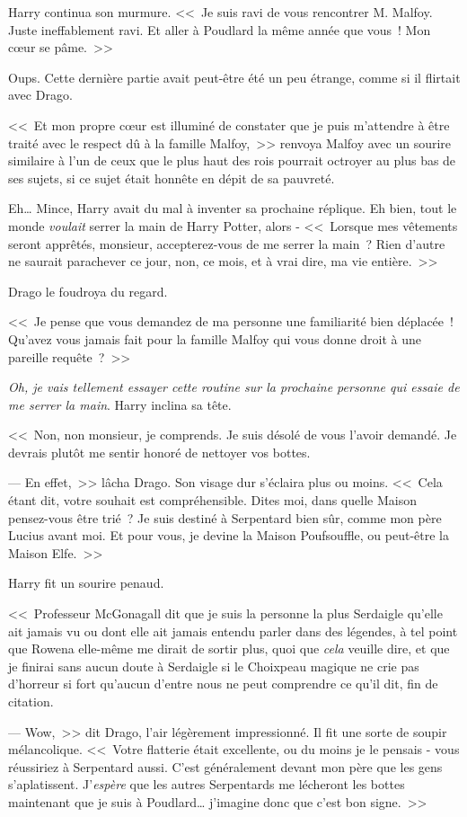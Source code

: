Harry continua son murmure. <<~Je suis ravi de vous rencontrer M. Malfoy. Juste ineffablement ravi. Et aller à Poudlard la même année que vous~! Mon cœur se pâme.~>>

Oups. Cette dernière partie avait peut-être été un peu étrange, comme si il flirtait avec Drago.

<<~Et mon propre cœur est illuminé de constater que je puis m'attendre à être traité avec le respect dû à la famille Malfoy,~>> renvoya Malfoy avec un sourire similaire à l'un de ceux que le plus haut des rois pourrait octroyer au plus bas de ses sujets, si ce sujet était honnête en dépit de sa pauvreté.

Eh… Mince, Harry avait du mal à inventer sa prochaine réplique. Eh bien, tout le monde \emph{voulait} serrer la main de Harry Potter, alors - <<~Lorsque mes vêtements seront apprêtés, monsieur, accepterez-vous de me serrer la main~? Rien d'autre ne saurait parachever ce jour, non, ce mois, et à vrai dire, ma vie entière.~>>

Drago le foudroya du regard. 

<<~Je pense que vous demandez de ma personne une familiarité bien déplacée~! Qu'avez vous jamais fait pour la famille Malfoy qui vous donne droit à une pareille requête~?~>>

\emph{Oh, je vais tellement essayer cette routine sur la prochaine personne qui essaie de me serrer la main}. Harry inclina sa tête. 

<<~Non, non monsieur, je comprends. Je suis désolé de vous l'avoir demandé. Je devrais plutôt me sentir honoré de nettoyer vos bottes.

--- En effet,~>> lâcha Drago. Son visage dur s'éclaira plus ou moins. <<~Cela étant dit, votre souhait est compréhensible. Dites moi, dans quelle Maison pensez-vous être trié~? Je suis destiné à Serpentard bien sûr, comme mon père Lucius avant moi. Et pour vous, je devine la Maison Poufsouffle, ou peut-être la Maison Elfe.~>>

Harry fit un sourire penaud. 

<<~Professeur McGonagall dit que je suis la personne la plus Serdaigle qu'elle ait jamais vu ou dont elle ait jamais entendu parler dans des légendes, à tel point que Rowena elle-même me dirait de sortir plus, quoi que \emph{cela} veuille dire, et que je finirai sans aucun doute à Serdaigle si le Choixpeau magique ne crie pas d'horreur si fort qu'aucun d'entre nous ne peut comprendre ce qu'il dit, fin de citation.

--- Wow,~>> dit Drago, l'air légèrement impressionné. Il fit une sorte de soupir mélancolique. <<~Votre flatterie était excellente, ou du moins je le pensais - vous réussiriez à Serpentard aussi. C'est généralement devant mon père que les gens s'aplatissent. J'\emph{espère} que les autres Serpentards me lécheront les bottes maintenant que je suis à Poudlard… j'imagine donc que c'est bon signe.~>>

